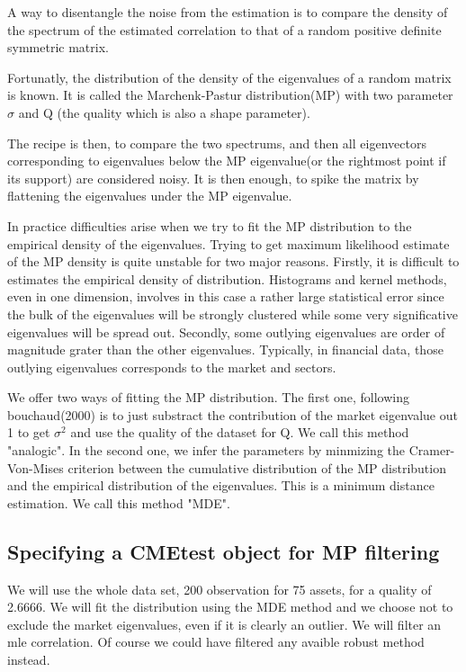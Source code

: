 \documentclass[12pt,letterpaper,english]{article}\usepackage[]{graphicx}\usepackage[]{color}
\begin{document}
A way to disentangle the noise from the estimation is to compare the density of the spectrum of the estimated correlation to that of a random positive definite symmetric matrix.

Fortunatly, the distribution of the density of the eigenvalues of a random matrix is known. It is called the Marchenk-Pastur distribution(MP) with two parameter $\sigma$ and Q (the quality which is also a shape parameter).

The recipe is then, to compare the two spectrums, and then all eigenvectors corresponding to eigenvalues below the MP eigenvalue(or the rightmost point if its support) are considered noisy. It is then enough, to spike the matrix by flattening the eigenvalues under the MP eigenvalue.

In practice difficulties arise when we try to fit the MP distribution to the empirical density of the eigenvalues. Trying to get maximum likelihood estimate of the MP density is quite unstable for two major reasons.
Firstly, it is difficult to estimates the empirical density of distribution. Histograms and kernel methods, even in one dimension, involves in this case a rather large statistical error since the bulk of the eigenvalues will be strongly clustered while some very significative eigenvalues will be spread out.
Secondly, some outlying eigenvalues are order of magnitude grater than the other eigenvalues. Typically, in financial data, those outlying eigenvalues corresponds to the market and sectors.

We offer two ways of fitting the MP distribution. 
The first one, following bouchaud(2000) is to just substract the contribution of the market eigenvalue out 1 to get $\sigma^2$ and use the quality of the dataset for Q. We call this method "analogic".
In the second one, we infer the parameters by minmizing the Cramer-Von-Mises criterion between the cumulative distribution of the MP distribution and the empirical distribution of the eigenvalues. This is a minimum distance estimation. We call this method "MDE".
\subsection{Specifying a CMEtest object for MP filtering}
We will use the whole data set, 200 observation for 75 assets, for a quality of 2.6666.
We will fit the distribution using the MDE method and we choose not to exclude the market eigenvalues, even if it is clearly an outlier. We will filter an mle correlation. Of course we could have filtered any avaible robust method instead.
\end{document}

